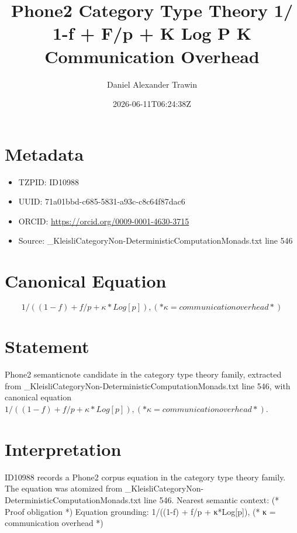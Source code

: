 \documentclass[11pt]{article}
\title{Phone2 Category Type Theory 1/ 1-f + F/p + Κ Log P Κ Communication Overhead}
\author{Daniel Alexander Trawin}
\date{2026-06-11T06:24:38Z}
\begin{document}
\maketitle
\section*{Metadata}
\begin{itemize}
\item TZPID: ID10988
\item UUID: 71a01bbd-c685-5831-a93c-c8c64f87dac6
\item ORCID: \url{https://orcid.org/0009-0001-4630-3715}
\item Source: _KleisliCategoryNon-DeterministicComputationMonads.txt line 546
\end{itemize}
\section*{Canonical Equation}
\[
1/((1-f) + f/p + κ*Log[p]), (* κ = communication overhead *)
\]
\section*{Statement}
Phone2 semanticnote candidate in the category type theory family, extracted from _KleisliCategoryNon-DeterministicComputationMonads.txt line 546, with canonical equation $1/((1-f) + f/p + κ*Log[p]), (* κ = communication overhead *)$.
\section*{Interpretation}
ID10988 records a Phone2 corpus equation in the category type theory family. The equation was atomized from _KleisliCategoryNon-DeterministicComputationMonads.txt line 546. Nearest semantic context: (* Proof obligation *) Equation grounding: 1/((1-f) + f/p + κ*Log[p]), (* κ = communication overhead *)
\end{document}
